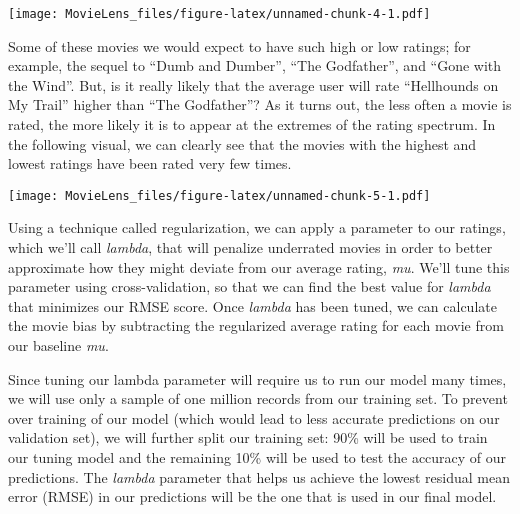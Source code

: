 \documentclass[
]{article}
\newenvironment{Shaded}{\begin{snugshade}}{\end{snugshade}}
\newcommand{\DataTypeTok}[1]{\textcolor[rgb]{0.13,0.29,0.53}{#1}}
\newcommand{\KeywordTok}[1]{\textcolor[rgb]{0.13,0.29,0.53}{\textbf{#1}}}
\newcommand{\NormalTok}[1]{#1}
\newcommand{\OperatorTok}[1]{\textcolor[rgb]{0.81,0.36,0.00}{\textbf{#1}}}
\newcommand{\StringTok}[1]{\textcolor[rgb]{0.31,0.60,0.02}{#1}}
\begin{document}
\texttt{[image: MovieLens\_files/figure-latex/unnamed-chunk-4-1.pdf]}

Some of these movies we would expect to have such high or low ratings;
for example, the sequel to ``Dumb and Dumber'', ``The Godfather'', and
``Gone with the Wind''. But, is it really likely that the average user
will rate ``Hellhounds on My Trail'' higher than ``The Godfather''? As
it turns out, the less often a movie is rated, the more likely it is to
appear at the extremes of the rating spectrum. In the following visual,
we can clearly see that the movies with the highest and lowest ratings
have been rated very few times.

\begin{Shaded}
\end{Shaded}

\texttt{[image: MovieLens\_files/figure-latex/unnamed-chunk-5-1.pdf]}

Using a technique called regularization, we can apply a parameter to our
ratings, which we'll call \emph{lambda}, that will penalize underrated
movies in order to better approximate how they might deviate from our
average rating, \emph{mu}. We'll tune this parameter using
cross-validation, so that we can find the best value for \emph{lambda}
that minimizes our RMSE score. Once \emph{lambda} has been tuned, we can
calculate the movie bias by subtracting the regularized average rating
for each movie from our baseline \emph{mu}.

Since tuning our lambda parameter will require us to run our model many
times, we will use only a sample of one million records from our
training set. To prevent over training of our model (which would lead to
less accurate predictions on our validation set), we will further split
our training set: 90\% will be used to train our tuning model and the
remaining 10\% will be used to test the accuracy of our predictions. The
\emph{lambda} parameter that helps us achieve the lowest residual mean
error (RMSE) in our predictions will be the one that is used in our
final model.
\end{document}
